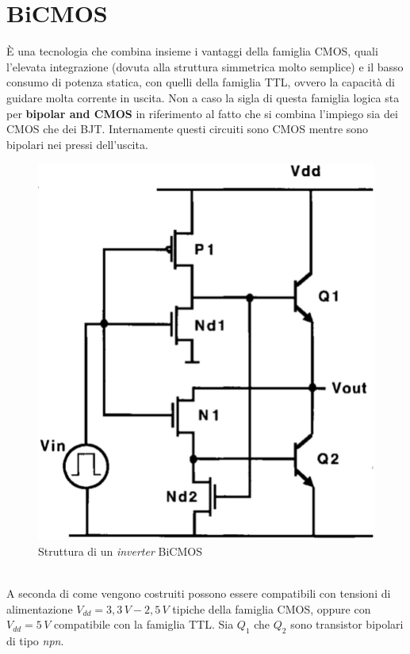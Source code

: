 \documentclass[12pt, a4paper]{report}
\begin{document}
\section{BiCMOS}
È una tecnologia che combina insieme i vantaggi della famiglia CMOS, quali l'elevata integrazione (dovuta alla struttura simmetrica molto semplice) e il basso consumo di potenza statica, con quelli della famiglia TTL, ovvero la capacità di guidare molta corrente in uscita. Non a caso la sigla di questa famiglia logica sta per \textbf{bipolar and CMOS} in riferimento al fatto che si combina l'impiego sia dei CMOS che dei BJT. Internamente questi circuiti sono CMOS mentre sono bipolari nei pressi dell'uscita.
\begin{figure}[h]
    \centering
    \includegraphics[scale=0.36,angle=0]{bicmos.png}
    \caption{Struttura di un \textit{inverter} BiCMOS}
    \label{not_bicmos}
\end{figure}
\\A seconda di come vengono costruiti possono essere compatibili con tensioni di alimentazione $V_{dd} = 3,3\,V - 2,5\,V$ tipiche della famiglia CMOS, oppure con $V_{dd} = 5\,V$ compatibile con la famiglia TTL. Sia $Q_1$ che $Q_2$ sono transistor bipolari di tipo \textit{npn}.
\end{document}
